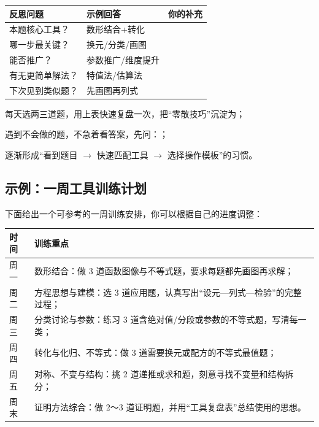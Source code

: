 \documentclass[a4paper,11pt]{ctexart}
\begin{document}
\begin{center}

\vspace{0.5em}
\begin{tabular}{p{} p{} p{}}
\hline
\textbf{反思问题} & \textbf{示例回答} & \textbf{你的补充} \\
\hline
本题核心工具？ & 数形结合+转化 & \\
哪一步最关键？ & 换元/分类/画图 & \\
能否推广？ & 参数推广/维度提升 & \\
有无更简单解法？ & 特值法/估算法 & \\
下次见到类似题？ & 先画图再列式 & \\
\hline
\end{tabular}
\end{center}

\begin{focuspoints}
  \item 每天选两三道题，用上表快速复盘一次，把“零散技巧”沉淀为；
  \item 遇到不会做的题，不急着看答案，先问：；
  \item 逐渐形成“看到题目 $\rightarrow$ 快速匹配工具 $\rightarrow$ 选择操作模板”的习惯。
\end{focuspoints}

\subsection{示例：一周工具训练计划}

下面给出一个可参考的一周训练安排，你可以根据自己的进度调整：

\begin{center}
\begin{tabular}{p{} p{}}
\hline
\textbf{时间} & \textbf{训练重点} \\
\hline
周一 & 数形结合：做 3 道函数图像与不等式题，要求每题都先画图再求解； \\
周二 & 方程思想与建模：选 3 道应用题，认真写出“设元—列式—检验”的完整过程； \\
周三 & 分类讨论与参数：练习 3 道含绝对值/分段或参数的不等式题，写清每一类； \\
周四 & 转化与化归、不等式：做 3 道需要换元或配方的不等式最值题； \\
周五 & 对称、不变与结构：挑 2 道递推或求和题，刻意寻找不变量和结构拆分； \\
周末 & 证明方法综合：做 2～3 道证明题，并用“工具复盘表”总结使用的思想。 \\
\hline
\end{tabular}
\end{center}
\end{document}
